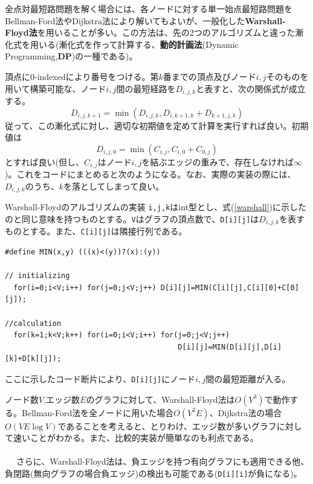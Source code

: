 全点対最短路問題を解く場合には、各ノードに対する単一始点最短路問題をBellman-Ford法やDijkstra法により解いてもよいが、一般化した\textbf{Warshall-Floyd法}を用いることが多い。この方法は、先の2つのアルゴリズムと違った漸化式を用いる(漸化式を作って計算する、\textbf{動的計画法}(Dynamic Programming,\textbf{DP})の一種である)。

頂点に0-indexedにより番号をつける。第$k$番までの頂点及びノード$i,j$そのものを用いて構築可能な、ノード$i,j$間の最短経路を$D_{i,j,k}$と表すと、次の関係式が成立する。
\begin{equation}
D_{i,j,k+1}=\min(D_{i,j,k},D_{i,k+1,k}+D_{k+1,j,k}) \label{warshall}
\end{equation}
従って、この漸化式に対し、適切な初期値を定めて計算を実行すれば良い。初期値は
\begin{equation}
D_{i,j,0}=\min(C_{i,j},C_{i,0}+C_{0,j})
\end{equation}
とすれば良い(但し、$C_{i,j}$はノード$i,j$を結ぶエッジの重みで、存在しなければ$\infty$)。これをコードにまとめると次のようになる。なお、実際の実装の際には、$D_{i,j,k}$のうち、$k$を落としてしまって良い。
\begin{itembox}[l]{Warshall-Floydのアルゴリズムの実装}
\verb|i,j,k|はint型とし、式(\ref{warshall})に示したのと同じ意味を持つものとする。\verb|V|はグラフの頂点数で、\verb|D[i][j]|は$D_{i,j,k}$を表すものとする。また、\verb|C[i][j]|は隣接行列である。
\begin{lstlisting}[caption=Warshall-Floydのアルゴリズム,label=program13_3]
#define MIN(x,y) (((x)<(y))?(x):(y))

// initializing
  for(i=0;i<V;i++) for(j=0;j<V;j++) D[i][j]=MIN(C[i][j],C[i][0]+C[0][j]);
 
//calculation 
  for(k=1;k<V;k++) for(i=0;i<V;i++) for(j=0;j<V;j++)
                                        D[i][j]=MIN(D[i][j],D[i][k]+D[k][j]);
\end{lstlisting}
ここに示したコード断片により、\verb|D[i][j]|にノード$i,j$間の最短距離が入る。
\end{itembox}

ノード数$V$,エッジ数$E$のグラフに対して、Warshall-Floyd法は$O(V^3)$で動作する。Bellman-Ford法を全ノードに用いた場合$O(V^2E)$、Dijkstra法の場合$O(VE\log V)$であることを考えると、とりわけ、エッジ数が多いグラフに対して速いことがわかる。また、比較的実装が簡単なのも利点である。
\\ \\　
さらに、Warshall-Floyd法は、負エッジを持つ有向グラフにも適用できる他、負閉路(無向グラフの場合負エッジ)の検出も可能である(\verb|D[i][i]|が負になる)。

